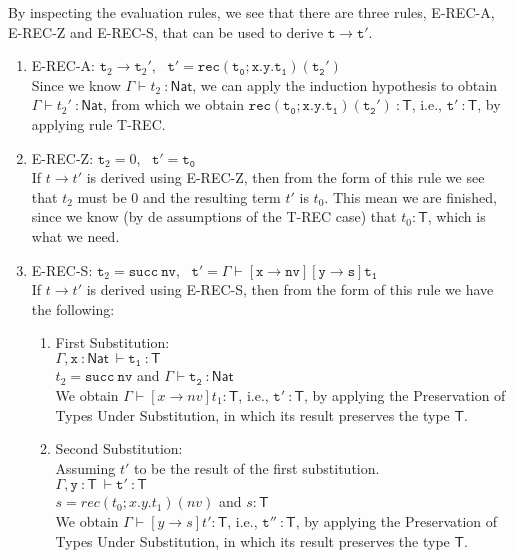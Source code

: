 \documentclass[a4paper]{article}
\begin{document}
\begin{enumerate}
By inspecting the evaluation rules, we see that there are three rules, E-REC-A, E-REC-Z and E-REC-S, that can be used to derive $\mathtt t \rightarrow \mathtt{t'}$.
\begin{enumerate}
\item E-REC-A: $\mathtt t_2 \rightarrow \mathtt t_2'$, \ $\mathtt{t' = {rec(t_0;x.y.t_1)(t_2')}}$
\\Since we know $\Gamma\vdash t_2 ~\mathsf{: Nat}$, we can apply the induction hypothesis to obtain $\Gamma\vdash t_2' ~\mathsf{: Nat}$, from which we obtain $\mathtt{rec(t_0;x.y.t_1)(t_2')}~\mathsf {:T}$, i.e., $\mathtt{t'}~\mathsf{:T}$, by applying rule T-REC.
\item E-REC-Z: $\mathtt t_2 = 0$, \ $\mathtt{t' = t_0}$
\\If $t \rightarrow t'$ is derived using E-REC-Z, then from the form of this rule we see that $t_2$ must be 0 and the resulting term $t'$ is $t_0$. This mean we are finished, since we know (by de assumptions of the T-REC case) that $t_0\mathsf{:T}$, which is what we need.
\item E-REC-S: $\mathtt t_2 = \mathtt{succ \ nv}$, \ $\mathtt{t' = \Gamma\vdash[x \rightarrow nv][y \rightarrow s] t_1}$
\\If $t \rightarrow t'$ is derived using E-REC-S, then from the form of this rule we have the following:
\begin{enumerate}
\item First Substitution:\\
$\mathtt{\Gamma, x}~\mathsf{:Nat}\mathtt{\ \vdash t_1}~\mathsf {:T}$ \\ 
$t_2 = \mathtt{succ \ nv}$ and $\mathtt{\Gamma\vdash t_2}~\mathsf {:Nat}$ \\
We obtain $\Gamma\vdash[x \rightarrow nv] t_1 \mathsf{:T}$, i.e., $\mathtt{t'}~\mathsf{:T}$, by applying the Preservation of Types Under Substitution, in which its result preserves the type $\mathsf{T}$.
\item Second Substitution:\\
Assuming $t'$ to be the result of the first substitution. \\
$\mathtt{\Gamma, y}~\mathsf{:T}\mathtt{\ \vdash t'}~\mathsf {:T}$ \\ 
$s = rec	(t_0;x.y.t_1)(nv)$ and $s \mathsf{:T}$\\
We obtain $\Gamma\vdash[y \rightarrow s] t' \mathsf{:T}$, i.e., $\mathtt{t''}~\mathsf{:T}$, by applying the Preservation of Types Under Substitution, in which its result preserves the type $\mathsf{T}$.
\end{enumerate}
\end{enumerate}
\end{enumerate}
\end{document}
